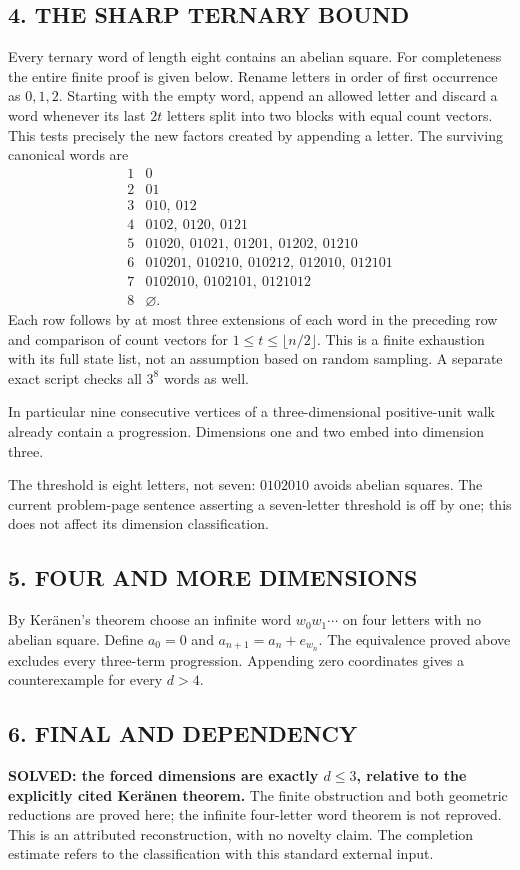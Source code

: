 \subsection*{4. THE SHARP TERNARY BOUND}
Every ternary word of length eight contains an abelian square. For completeness the entire finite proof is given below. Rename letters in order of first occurrence as $0,1,2$. Starting with the empty word, append an allowed letter and discard a word whenever its last $2t$ letters split into two blocks with equal count vectors. This tests precisely the new factors created by appending a letter. The surviving canonical words are
\[
\begin{array}{c|l}
1&0\\
2&01\\
3&010,\ 012\\
4&0102,\ 0120,\ 0121\\
5&01020,\ 01021,\ 01201,\ 01202,\ 01210\\
6&010201,\ 010210,\ 010212,\ 012010,\ 012101\\
7&0102010,\ 0102101,\ 0121012\\
8&\varnothing.
\end{array}
\]
Each row follows by at most three extensions of each word in the preceding row and comparison of count vectors for $1\le t\le\lfloor n/2\rfloor$. This is a finite exhaustion with its full state list, not an assumption based on random sampling. A separate exact script checks all $3^8$ words as well.

In particular nine consecutive vertices of a three-dimensional positive-unit walk already contain a progression. Dimensions one and two embed into dimension three.

The threshold is eight letters, not seven: $0102010$ avoids abelian squares. The current problem-page sentence asserting a seven-letter threshold is off by one; this does not affect its dimension classification.
\subsection*{5. FOUR AND MORE DIMENSIONS}
By Ker\"anen's theorem choose an infinite word $w_0w_1\cdots$ on four letters with no abelian square. Define $a_0=0$ and $a_{n+1}=a_n+e_{w_n}$. The equivalence proved above excludes every three-term progression. Appending zero coordinates gives a counterexample for every $d>4$.
\subsection*{6. FINAL AND DEPENDENCY}
\textbf{SOLVED: the forced dimensions are exactly $d\le3$, relative to the explicitly cited Ker\"anen theorem.}
The finite obstruction and both geometric reductions are proved here; the infinite four-letter word theorem is not reproved. This is an attributed reconstruction, with no novelty claim. The completion estimate refers to the classification with this standard external input.
